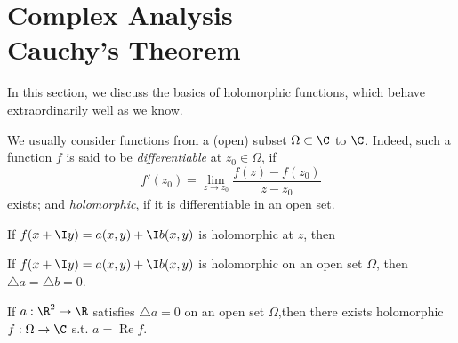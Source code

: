 \section[Section Title. Section Subtitle]{Complex Analysis\\ {\large Cauchy's Theorem}}

In this section, we discuss the basics of holomorphic functions, which behave extraordinarily well as we know.

\begin{definition}
    We usually consider functions from a (open) subset $\Omega\subset\C$ to $\C$. Indeed, such a function $f$ is said to be \emph{differentiable} at $z_0\in\Omega$, if
    $$f'(z_0)=\lim_{z\to z_0}\frac{f(z)-f(z_0)}{z-z_0}$$
    exists; and \emph{holomorphic}, if it is differentiable in an open set.
\end{definition}

\begin{theorem}[C-R equation]
    If $f(x+\I y)=a(x,y)+\I b(x,y)$ is holomorphic at $z$, then 
\end{theorem}

\begin{proposition}
    If $f(x+\I y)=a(x,y)+\I b(x,y)$ is holomorphic on an open set $\Omega$, then $\triangle a=\triangle b=0$.
\end{proposition}

\begin{proposition}
    If $a:\R^2\to\R$ satisfies $\triangle a=0$ on an open set $\Omega$,then there exists holomorphic $f:\Omega\to\C$ s.t. $a=\operatorname{Re}f$.
\end{proposition}